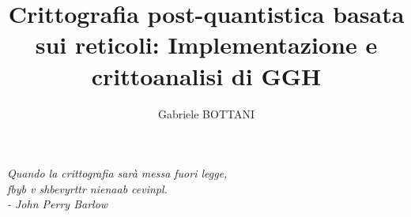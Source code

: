 \documentclass[a4paper,12pt]{report}
\theoremstyle{definition}
\begin{document}
\title{Crittografia post-quantistica basata sui reticoli: Implementazione e crittoanalisi di GGH}
\author{Gabriele BOTTANI}
\figurespagetrue
\tablespagetrue
% 
%
\beforepreface
\prefacesection{}
\begin{flushright}
  {\Large 
  \textsl{Quando la crittografia sarà messa fuori legge,\\
  fbyb v shbevyrttr nienaab cevinpl.\\[10pt]
  - John Perry Barlow}
  }
\end{flushright}

\afterpreface
% 
% 

%

%

%

%

%

%

%
%
\end{document}
